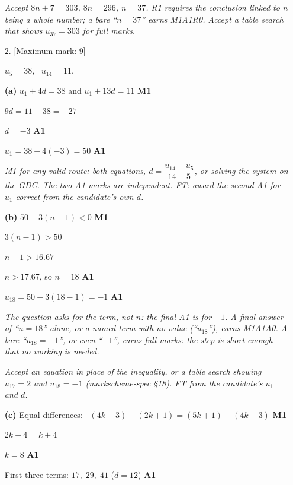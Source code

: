 \documentclass[12pt, twoside]{article}
\begin{document}
\begin{enumerate}[itemsep=0.3cm]
\emph{Accept $8n + 7 = 303$, $8n = 296$, $n = 37$. R1 requires the
conclusion linked to $n$ being a whole number; a bare ``$n = 37$'' earns
M1A1R0. Accept a table search that shows $u_{37} = 303$ for full marks.}

\newpage

\item[2.] [Maximum mark: 9]

$u_{5} = 38$, \ $u_{14} = 11$.

\medskip

\textbf{(a)} $u_{1} + 4d = 38$ \quad and \quad $u_{1} + 13d = 11$
\hfill \textbf{M1}

$9d = 11 - 38 = -27$

$d = -3$ \hfill \textbf{A1}

$u_{1} = 38 - 4(-3) = 50$ \hfill \textbf{A1}

\emph{M1 for any valid route: both equations, $d = \dfrac{u_{14} -
u_{5}}{14 - 5}$, or solving the system on the GDC. The two A1 marks are
independent. FT: award the second A1 for $u_{1}$ correct from the
candidate's own $d$.}

\medskip

\textbf{(b)} $50 - 3(n - 1) < 0$ \hfill \textbf{M1}

$3(n - 1) > 50$

$n - 1 > 16.67$

$n > 17.67$, so $n = 18$ \hfill \textbf{A1}

$u_{18} = 50 - 3(18 - 1) = -1$ \hfill \textbf{A1}

\emph{The question asks for the term, not $n$: the final A1 is for $-1$.
A final answer of ``$n = 18$'' alone, or a named term with no value
(``$u_{18}$''), earns M1A1A0. A bare ``$u_{18} = -1$'',
or even ``$-1$'', earns full marks: the step is short enough that no
working is needed.}

\emph{Accept an equation in place of the inequality, or a table search
showing $u_{17} = 2$ and $u_{18} = -1$ (markscheme-spec §18). FT from the
candidate's $u_{1}$ and $d$.}

\medskip

\textbf{(c)} Equal differences: \ $(4k - 3) - (2k + 1) = (5k + 1) - (4k
- 3)$ \hfill \textbf{M1}

$2k - 4 = k + 4$

$k = 8$ \hfill \textbf{A1}

First three terms: $17,\; 29,\; 41$ \quad ($d = 12$) \hfill \textbf{A1}


\end{enumerate}
\end{document}
